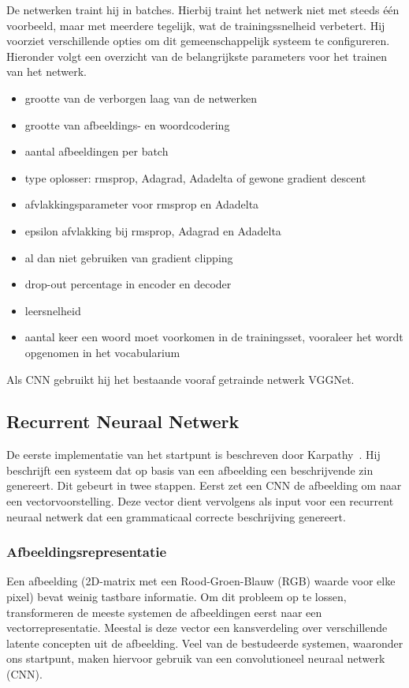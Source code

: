 De netwerken traint hij in batches. Hierbij traint het netwerk niet met steeds \'e\'en voorbeeld, maar met meerdere tegelijk, wat de trainingssnelheid verbetert. 
Hij voorziet verschillende opties om dit gemeenschappelijk systeem te configureren. Hieronder volgt een overzicht van de belangrijkste parameters voor het trainen van het netwerk.
\begin{itemize}
	\item grootte van de verborgen laag van de netwerken
	\item grootte van afbeeldings- en woordcodering
	\item aantal afbeeldingen per batch
	\item type oplosser: rmsprop, Adagrad, Adadelta of gewone gradient descent
	\item afvlakkingsparameter voor rmsprop en Adadelta
	\item epsilon afvlakking bij rmsprop, Adagrad en Adadelta
	\item al dan niet gebruiken van gradient clipping
	\item drop-out percentage in encoder en decoder
	\item leersnelheid
	\item aantal keer een woord moet voorkomen in de trainingsset, vooraleer het wordt opgenomen in het vocabularium
\end{itemize}
Als CNN gebruikt hij het bestaande vooraf getrainde netwerk VGGNet.

\subsection{Recurrent Neuraal Netwerk}
\label{sec:rnn_methodology}
De eerste implementatie van het startpunt is beschreven door Karpathy~\cite{Karpathy2015}. Hij beschrijft een systeem dat op basis van een afbeelding een beschrijvende zin genereert. Dit gebeurt in twee stappen. Eerst zet een CNN de afbeelding om naar een vectorvoorstelling. Deze vector dient vervolgens als input voor een recurrent neuraal netwerk dat een grammaticaal correcte beschrijving genereert.

\subsubsection{Afbeeldingsrepresentatie}
\label{sec:usedcnn}
Een afbeelding (2D-matrix met een Rood-Groen-Blauw (RGB) waarde voor elke pixel) bevat weinig tastbare informatie. Om dit probleem op te lossen, transformeren de meeste systemen de afbeeldingen eerst naar een vectorrepresentatie. Meestal is deze vector een kansverdeling over verschillende latente concepten uit de afbeelding. Veel van de bestudeerde systemen, waaronder ons startpunt, maken hiervoor gebruik van een convolutioneel neuraal netwerk (CNN).

